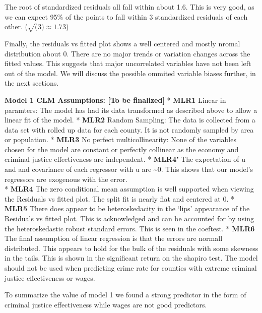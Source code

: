 \documentclass[]{article}
\newenvironment{Shaded}{}{}
\newcommand{\KeywordTok}[1]{\textcolor[rgb]{0.00,0.00,1.00}{#1}}
\newcommand{\NormalTok}[1]{#1}
\newcommand{\OperatorTok}[1]{#1}
\begin{document}
The root of standardized residuals all fall within about 1.6. This is
very good, as we can expect 95\% of the points to fall within 3
standardized residuals of each other. (\(\sqrt(3) \approx 1.73\))

Finally, the residuals vs fitted plot shows a well centered and mostly
nromal distribution about 0. There are no major trends or variation
changes across the fitted values. This suggests that major uncorrelated
variables have not been left out of the model. We will discuss the
possible ommited variable biases further, in the next sections.

\textbf{Model 1 CLM Assumptions: {[}To be finalized{]}} * \textbf{MLR1}
Linear in paramters: The model has had its data transformed as described
above to allow a linear fit of the model. * \textbf{MLR2} Random
Sampling: The data is collected from a data set with rolled up data for
each county. It is not randomly sampled by area or population. *
\textbf{MLR3} No perfect multicollinearity: None of the variables chosen
for the model are constant or perfectly collinear as the economy and
criminal justice effectiveness are independent. * \textbf{MLR4'} The
expectation of u and and covariance of each regressor with u are
\textasciitilde{}0. This shows that our model's regressors are exogenous
with the error.\\
* \textbf{MLR4} The zero conditional mean assumption is well supported
when viewing the Residuals vs fitted plot. The split fit is nearly flat
and centered at 0. * \textbf{MLR5} There does appear to be
heteroskedacity in the `lips' appearance of the Residuals vs fitted
plot. This is acknowledged and can be accounted for by using the
heteroskedastic robust standard errors. This is seen in the coeftest. *
\textbf{MLR6} The final assumption of linear regression is that the
errors are normall distributed. This appears to hold for the bulk of the
residuals with some skewness in the tails. This is shown in the
significant return on the shapiro test. The model should not be used
when predicting crime rate for counties with extreme criminal justice
effectiveness or wages.

To summarize the value of model 1 we found a strong predictor in the
form of criminal justice effectiveness while wages are not good
predictors.

\begin{Shaded}
\end{Shaded}
\end{document}
